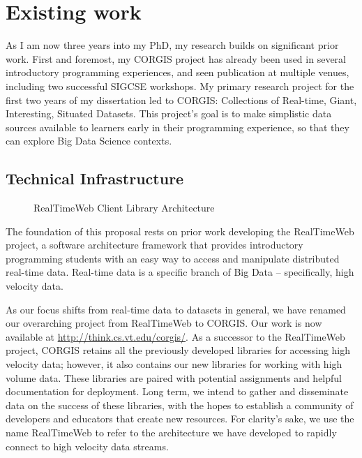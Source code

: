 \section{Existing work}

As I am now three years into my PhD, my research builds on significant prior work. First and foremost, my CORGIS project has already been used in several introductory programming experiences, and seen publication at multiple venues, including two successful SIGCSE workshops.
My primary research project for the first two years of my dissertation led to CORGIS: Collections of Real-time, Giant, Interesting, Situated Datasets.
This project's goal is to make simplistic data sources available to learners early in their programming experience, so that they can explore Big Data Science contexts.

\subsection{Technical Infrastructure}

\begin{wrapfigure}{R}{0.5\textwidth}
    \begin{center}
    \end{center}
    \vspace{-\bigskipamount}
    \caption{RealTimeWeb Client Library Architecture}
    \label{fig-cla}
\end{wrapfigure}

The foundation of this proposal rests on prior work developing the RealTimeWeb project, a software architecture framework that provides introductory programming students with an easy way to access and manipulate distributed real-time data\cite{bart-transforming}.
Real-time data is a specific branch of Big Data -- specifically, high velocity data.

As our focus shifts from real-time data to datasets in general, we have renamed our overarching project from RealTimeWeb to CORGIS. Our work is now available at \url{http://think.cs.vt.edu/corgis/}. As a successor to the RealTimeWeb project, CORGIS retains all the previously developed libraries for accessing high velocity data; however, it also contains our new libraries for working with high volume data.
These libraries are paired with potential assignments and helpful documentation for deployment.
Long term, we intend to gather and disseminate data on the success of these libraries, with the hopes to establish a community of developers and educators that create new resources.
For clarity's sake, we use the name RealTimeWeb to refer to the architecture we have developed to rapidly connect to high velocity data streams.

